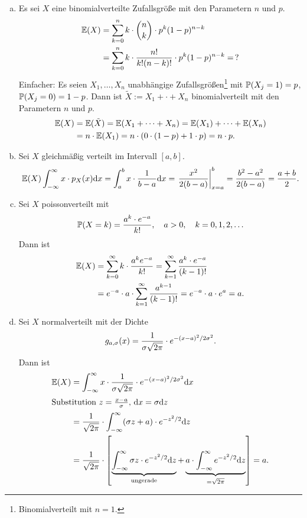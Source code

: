 \begin{exmp}
  \begin{enumerate}[(a)]
  \item Es sei $X$ eine binomialverteilte Zufallsgröße mit den Parametern $n$
    und $p$.
    \begin{align*}
      \mathbb{E}(X)
      &= \sum_{k=0}^n k \cdot \binom{n}{k} \cdot p^k (1-p)^{n-k} \\
      &= \sum_{k=0}^n k \cdot \frac{n!}{k! (n-k)!} \cdot p^k (1-p)^{n-k} = \, ?
    \end{align*}
    Einfacher: Es seien $X_1, \ldots, X_n$ unabhängige Zufallsgrößen\footnote{%
      Binomialverteilt mit $n=1$.}
    mit $\mathbb{P}(X_j = 1) = p$, $\mathbb{P}(X_j = 0) = 1-p$. Dann ist $\tilde{X} := X_1 +
    \cdot + X_n$ binomialverteilt mit den Parametern $n$ und $p$.
    \begin{align*}
      \mathbb{E}(X)
      &= \mathbb{E}( \tilde{X} ) = \mathbb{E}( X_1 + \cdots + X_n ) = \mathbb{E}(X_1) + \cdots + \mathbb{E}(X_n) \\
      &= n \cdot \mathbb{E}(X_1) = n \cdot (0 \cdot (1-p) + 1 \cdot p ) = n \cdot p.
    \end{align*}
  \item Sei $X$ gleichmäßig verteilt im Intervall $[a,b]$.
    \[ \mathbb{E}(X) \int_{-\infty}^\infty x \cdot p_X(x) \mathrm{d} x = \int_a^b x \cdot
      \frac{1}{b-a} \mathrm{d} x = \left. \frac{x^2}{2(b-a)} \right|_{x=a}^b =
      \frac{b^2 - a^2}{2(b-a)} = \frac{a+b}{2}. \]
  \item Sei $X$ poissonverteilt mit
    \[ \mathbb{P}( X = k ) = \frac{a^k \cdot e^{-a}}{k!}, \quad a > 0, \quad k = 0, 1,
      2, \ldots \]
    Dann ist
    \begin{align*}
      \mathbb{E}( X ) & = \sum_{k=0}^\infty k \cdot \frac{a^k e^{-a}}{k!}
                 = \sum_{k=1}^\infty \frac{a^k \cdot e^{-a}}{(k-1)!} \\
               & = e^{-a} \cdot a  \cdot \sum_{k=1}^\infty \frac{a^{k-1}}{(k-1)!}
                 = e^{-a} \cdot a \cdot e^a = a.
    \end{align*}
  \item Sei $X$ normalverteilt mit der Dichte
    \[ g_{a,\sigma}(x) = \frac{1}{\sigma \sqrt{2 \pi}} \cdot e^{-(x-a)^2 / 2
        \sigma^2}. \]
    Dann ist
    \begin{align*}
      \pE(X)
      & = \int_{-\infty}^\infty x \cdot \rez{\sigma \sqrt{2 \pi}}
        \cdot e^{-(x-a)^2 / 2 \sigma^2} \diffop x \\
      \intertext{Substitution $z = \frac{x-a}{\sigma}$, $\diffop x = \sigma \diffop z$}
      & = \rez{\sqrt{2 \pi}} \cdot \int_{-\infty}^\infty (\sigma z + a)
        \cdot e^{-z^2 / 2} \diffop z \\
      & = \rez{\sqrt{2 \pi}} \cdot
        \left[ \underbrace{%
        \int_{-\infty}^\infty \sigma z \cdot e^{-z^2 / 2} \diffop z
        }_{\text{ungerade}}
        + \underbrace{%
        a \cdot \int_{-\infty}^\infty e^{-z^2 / 2} \diffop z
        }_{= \sqrt{2 \pi} } \right]
        = a.
    \end{align*}
  \end{enumerate}
\end{exmp}

